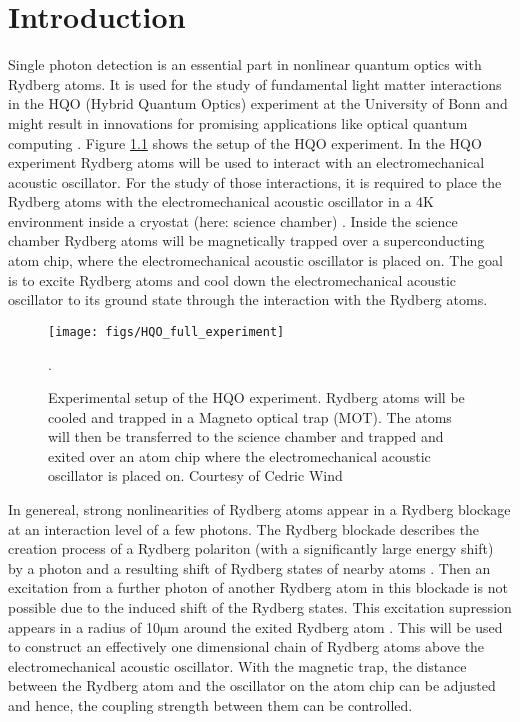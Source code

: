 
\chapter{Introduction}
\label{sec:SNSPD_Introduction}

Single photon detection is an essential part in nonlinear quantum optics with Rydberg atoms. 
It is used for the study of fundamental light matter interactions in
the HQO (Hybrid Quantum Optics) experiment at the University of Bonn and might result in innovations for promising
applications like optical quantum computing \cite{firstenberg-2016, gao-2011}.
Figure \ref{fig: HQO_full_experiment} shows the setup of the HQO experiment.
In the HQO experiment Rydberg atoms will be used to interact with an electromechanical acoustic oscillator.
For the study of those interactions, it is required to place the Rydberg atoms with the electromechanical acoustic oscillator
in a 4K environment inside a cryostat (here: science chamber) \cite{oconnell-2010}.
Inside the science chamber Rydberg atoms will be magnetically trapped over a superconducting atom chip, where the electromechanical
acoustic oscillator is placed on.
The goal is to excite Rydberg atoms and cool down the electromechanical acoustic oscillator to its ground state through the interaction with
the Rydberg atoms.

\begin{figure}[hbt!]
 \centering
 \texttt{[image: figs/HQO\_full\_experiment]}
 \caption{Experimental setup of the HQO experiment. Rydberg atoms will be cooled and trapped in
 a Magneto optical trap (MOT).
 The atoms will then be transferred to the science chamber and trapped and exited over an atom chip where the
 electromechanical acoustic oscillator is placed on. Courtesy of Cedric Wind}.
 \label{fig: HQO_full_experiment}
\end{figure}

In genereal, strong nonlinearities of Rydberg atoms appear in a Rydberg blockage at an interaction level of a few photons.
The Rydberg blockade describes the creation process of a Rydberg polariton (with a significantly large energy shift) by a photon and a
resulting shift of Rydberg states of nearby atoms \cite{lukin-2001}.
Then an excitation from a further photon of another Rydberg atom in this blockade is not possible due to the induced shift of the Rydberg states.
This excitation supression appears in a radius of 10$\si{\micro \m}$ around the exited Rydberg atom \cite{urban-2009}.
This will be used to construct an effectively one dimensional chain of Rydberg atoms above the electromechanical acoustic oscillator.
With the magnetic trap, the distance between the Rydberg atom and the oscillator on the atom chip can be adjusted and hence, the coupling
strength between them can be controlled.

